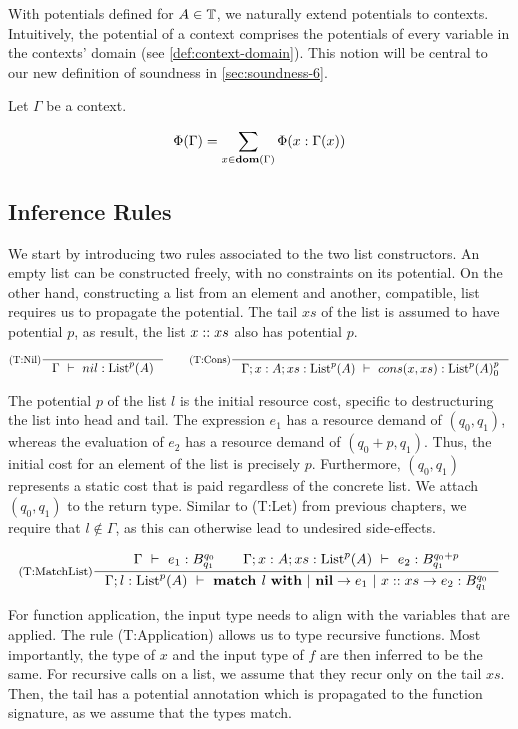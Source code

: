 With potentials defined for \(A \in \mathbb{T}\), we naturally extend potentials to contexts. Intuitively, the potential of a context comprises the potentials of every variable in the contexts' domain (see \cref{def:context-domain}). This notion will be central to our new definition of soundness in \cref{sec:soundness-6}.

\begin{definition}\label{def:context-potential}
   Let \(\Gamma\) be a context.

   \[
      \Phi(\Gamma) = \sum_{x \in \textbf{dom}(\Gamma)} \Phi(x : \Gamma(x))
   \]
\end{definition}

\subsection{Inference Rules}

We start by introducing two rules associated to the two list constructors. An empty list can be constructed freely, with no constraints on its potential. On the other hand, constructing a list from an element and another, compatible, list requires us to propagate the potential. The tail \(xs\) of the list is assumed to have potential \(p\), as result, the list \(x :: xs\) also has potential \(p\). 

\[
   \inference[(T:Nil)]
   {}
   {\typing{\Gamma}{nil}{\ralist{p}{A}}}
   \qquad
   \inference[(T:Cons)]
   {}
   {\typing{\Gamma;x : A; xs : \ralist{p}{A}}{cons(x, xs)}{\ratype{\ralist{p}{A}}{p}{0}}}
\]

The potential \(p\) of the list \(l\) is the initial resource cost, specific to destructuring the list into head and tail. The expression \(e_1\) has a resource demand of \((q_0, q_1)\), whereas the evaluation of \(e_2\) has a resource demand of \((q_0 + p, q_1)\). Thus, the initial cost for an element of the list is precisely \(p\). Furthermore, \((q_0, q_1)\) represents a static cost that is paid regardless of the concrete list. We attach \((q_0, q_1)\) to the return type. Similar to (T:Let) from previous chapters, we require that \(l \notin \Gamma\), as this can otherwise lead to undesired side-effects.

\[
   \inference[(T:MatchList)]
   {\typing{\Gamma}{e_1}{\ratype{B}{q_0}{q_1}} \qquad \typing{\Gamma;x : A; xs : \ralist{p}{A}}{e_2}{\ratype{B}{q_0 + p}{q_1}}}
   {\typing{\Gamma;l : \ralist{p}{A}}{\listmatch{l}{e_1}{e_2}}{\ratype{B}{q_0}{q_1}}}
\]

For function application, the input type needs to align with the variables that are applied. The rule (T:Application) allows us to type recursive functions. Most importantly, the type of \(x\) and the input type of \(f\) are then inferred to be the same. For recursive calls on a list, we assume that they recur only on the tail \(xs\). Then, the tail has a potential annotation which is propagated to the function signature, as we assume that the types match.

